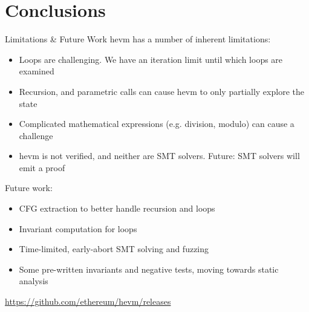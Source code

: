 \documentclass[aspectratio=169]{beamer}
\begin{document}
\section{Conclusions}

\begin{frame}[fragile=singleslide]{Limitations \& Future Work}
hevm has a number of inherent limitations:

\begin{itemize}
\item Loops are challenging. We have an iteration limit until which loops are examined
\item Recursion, and parametric calls can cause hevm to only partially explore the state
\item Complicated mathematical expressions (e.g. division, modulo) can cause a challenge
\item hevm is not verified, and neither are SMT solvers. Future: SMT solvers will emit a proof
\end{itemize}
\vspace{2ex}

Future work:
\begin{itemize}
\item CFG extraction to better handle recursion and loops
\item Invariant computation for loops
\item Time-limited, early-abort SMT solving and fuzzing
\item Some pre-written invariants and negative tests, moving towards static analysis
\end{itemize}

\bigskip

\quad  {}
\qquad \url{https://github.com/ethereum/hevm/releases}

\end{frame}

%
%
%
%
\end{document}
